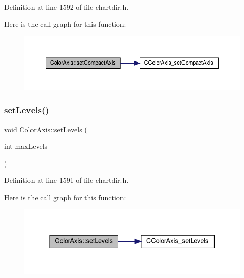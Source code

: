 Definition at line 1592 of file chartdir.\+h.

Here is the call graph for this function\+:
\nopagebreak
\begin{figure}[H]
\begin{center}
\leavevmode
\includegraphics[width=350pt]{class_color_axis_a5a1797dffe8ef43447a920cd50e6c7d4_cgraph}
\end{center}
\end{figure}
\mbox{\label{class_color_axis_af9791e5ea41aa81191e6b88876f35348}} 
\subsubsection{\texorpdfstring{set\+Levels()}{setLevels()}}
{\footnotesize\ttfamily void Color\+Axis\+::set\+Levels (\begin{DoxyParamCaption}\item[{int}]{max\+Levels }\end{DoxyParamCaption})\hspace{0.3cm}{\ttfamily [inline]}}



Definition at line 1591 of file chartdir.\+h.

Here is the call graph for this function\+:
\nopagebreak
\begin{figure}[H]
\begin{center}
\leavevmode
\includegraphics[width=337pt]{class_color_axis_af9791e5ea41aa81191e6b88876f35348_cgraph}
\end{center}
\end{figure}
\mbox{\label{class_color_axis_a0bcbd3e8e36d3997f393261bf5432fcb}} 
